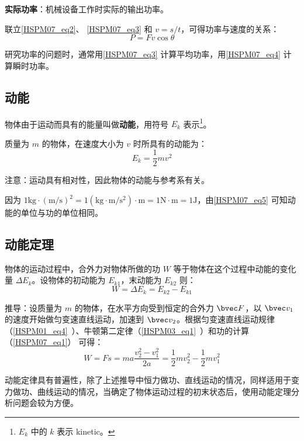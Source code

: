 \textbf{实际功率}：机械设备工作时实际的输出功率。

联立\autoref{HSPM07_eq2}、 \autoref{HSPM07_eq3} 和 $v=s/t$，可得功率与速度的关系：
\begin{equation}\label{HSPM07_eq4}
P=Fv\cos \theta
\end{equation}

研究功率的问题时，通常用\autoref{HSPM07_eq3} 计算平均功率，用\autoref{HSPM07_eq4} 计算瞬时功率。

\subsection{动能}

物体由于运动而具有的能量叫做\textbf{动能}，用符号 $E_k$ 表示\footnote{$E_k$ 中的 $k$ 表示 kinetic。}。

质量为 $m$ 的物体，在速度大小为 $v$ 时所具有的动能为：
\begin{equation}\label{HSPM07_eq5}
E_k=\frac12mv^2
\end{equation}

注意：运动具有相对性，因此物体的动能与参考系有关。

因为 $\mathrm{1kg\cdot (m/s)^2=1(kg\cdot m/s^2)\cdot m=1N\cdot m=1J}$，由\autoref{HSPM07_eq5} 可知动能的单位与功的单位相同。

\subsection{动能定理}

物体的运动过程中，合外力对物体所做的功 $W$ 等于物体在这个过程中动能的变化量 $\Delta E_k$。设物体的初动能为 $E_{k1}$，末动能为 $E_{k2}$ 则：
\begin{equation}\label{HSPM07_eq6}
W=\Delta E_k =E_{k2}-E_{k1}
\end{equation}

推导：设质量为 $m$ 的物体，在水平方向受到恒定的合外力 $\bvec F$，以 $\bvec v_1$ 的速度开始做匀变速直线运动，加速到 $\bvec v_2$。根据匀变速直线运动规律（\autoref{HSPM01_eq4}~）、牛顿第二定律（\autoref{HSPM03_eq1}~）和功的计算（\autoref{HSPM07_eq1}） 可得：
\begin{equation}
W=Fs=ma\frac{v_2^2-v_1^2}{2a}=\frac12mv_2^2-\frac12mv_1^2
\end{equation}

动能定律具有普遍性，除了上述推导中恒力做功、直线运动的情况，同样适用于变力做功、曲线运动的情况，当确定了物体运动过程的初末状态后，使用动能定理分析问题会较为方便。

